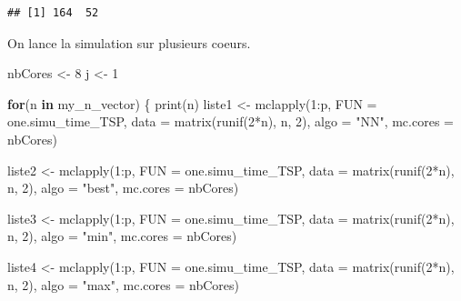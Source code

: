 \documentclass[
]{article}
\newenvironment{Shaded}{\begin{snugshade}}{\end{snugshade}}
\newcommand{\AttributeTok}[1]{\textcolor[rgb]{0.77,0.63,0.00}{#1}}
\newcommand{\ControlFlowTok}[1]{\textcolor[rgb]{0.13,0.29,0.53}{\textbf{#1}}}
\newcommand{\DecValTok}[1]{\textcolor[rgb]{0.00,0.00,0.81}{#1}}
\newcommand{\FunctionTok}[1]{\textcolor[rgb]{0.00,0.00,0.00}{#1}}
\newcommand{\NormalTok}[1]{#1}
\newcommand{\OtherTok}[1]{\textcolor[rgb]{0.56,0.35,0.01}{#1}}
\newcommand{\SpecialCharTok}[1]{\textcolor[rgb]{0.00,0.00,0.00}{#1}}
\newcommand{\StringTok}[1]{\textcolor[rgb]{0.31,0.60,0.02}{#1}}
\begin{document}
\begin{verbatim}
## [1] 164  52
\end{verbatim}

On lance la simulation sur plusieurs coeurs.

\begin{Shaded}
\begin{Highlighting}[]
\NormalTok{nbCores }\OtherTok{\textless{}{-}} \DecValTok{8}
\NormalTok{j }\OtherTok{\textless{}{-}} \DecValTok{1}

\ControlFlowTok{for}\NormalTok{(n }\ControlFlowTok{in}\NormalTok{ my\_n\_vector)}
\NormalTok{\{}
  \FunctionTok{print}\NormalTok{(n)}
\NormalTok{  liste1 }\OtherTok{\textless{}{-}} \FunctionTok{mclapply}\NormalTok{(}\DecValTok{1}\SpecialCharTok{:}\NormalTok{p, }\AttributeTok{FUN =}\NormalTok{ one.simu\_time\_TSP,}
                      \AttributeTok{data =} \FunctionTok{matrix}\NormalTok{(}\FunctionTok{runif}\NormalTok{(}\DecValTok{2}\SpecialCharTok{*}\NormalTok{n), n, }\DecValTok{2}\NormalTok{),}
                     \AttributeTok{algo =} \StringTok{"NN"}\NormalTok{,}
                     \AttributeTok{mc.cores =}\NormalTok{ nbCores)}

\NormalTok{  liste2 }\OtherTok{\textless{}{-}} \FunctionTok{mclapply}\NormalTok{(}\DecValTok{1}\SpecialCharTok{:}\NormalTok{p, }\AttributeTok{FUN =}\NormalTok{ one.simu\_time\_TSP,}
                     \AttributeTok{data =} \FunctionTok{matrix}\NormalTok{(}\FunctionTok{runif}\NormalTok{(}\DecValTok{2}\SpecialCharTok{*}\NormalTok{n), n, }\DecValTok{2}\NormalTok{),}
                     \AttributeTok{algo =} \StringTok{"best"}\NormalTok{,}
                     \AttributeTok{mc.cores =}\NormalTok{ nbCores)}

\NormalTok{  liste3 }\OtherTok{\textless{}{-}} \FunctionTok{mclapply}\NormalTok{(}\DecValTok{1}\SpecialCharTok{:}\NormalTok{p, }\AttributeTok{FUN =}\NormalTok{ one.simu\_time\_TSP,}
                     \AttributeTok{data =} \FunctionTok{matrix}\NormalTok{(}\FunctionTok{runif}\NormalTok{(}\DecValTok{2}\SpecialCharTok{*}\NormalTok{n), n, }\DecValTok{2}\NormalTok{),}
                     \AttributeTok{algo =} \StringTok{"min"}\NormalTok{,}
                     \AttributeTok{mc.cores =}\NormalTok{ nbCores)}

\NormalTok{  liste4 }\OtherTok{\textless{}{-}} \FunctionTok{mclapply}\NormalTok{(}\DecValTok{1}\SpecialCharTok{:}\NormalTok{p, }\AttributeTok{FUN =}\NormalTok{ one.simu\_time\_TSP,}
                     \AttributeTok{data =} \FunctionTok{matrix}\NormalTok{(}\FunctionTok{runif}\NormalTok{(}\DecValTok{2}\SpecialCharTok{*}\NormalTok{n), n, }\DecValTok{2}\NormalTok{),}
                     \AttributeTok{algo =} \StringTok{"max"}\NormalTok{,}
                     \AttributeTok{mc.cores =}\NormalTok{ nbCores)}



\end{Highlighting}
\end{Shaded}
\end{document}
